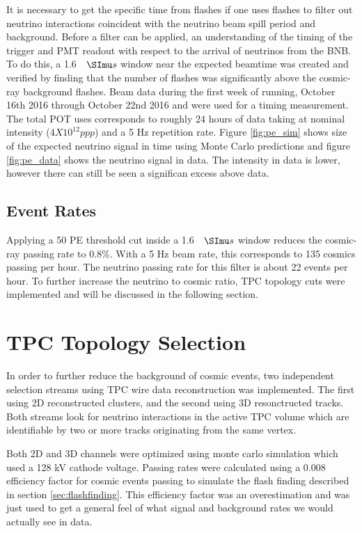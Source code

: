 It is necessary to get the specific time from flashes if one uses flashes to filter out neutrino interactions coincident with the neutrino beam spill period and background. Before a filter can be applied, an understanding of the timing of the trigger and PMT readout with respect to the arrival of neutrinos from the BNB. To do this, a 1.6 $\micro s$ window near the expected beamtime was created and verified by finding that the number of flashes was significantly above the cosmic-ray background flashes. Beam data during the first week of running, October 16th 2016 through October 22nd 2016 and were used for a timing measurement. The total POT uses corresponds to roughly 24 hours of data taking at nominal intensity ($4 X 10^{12} ppp$) and a 5 Hz repetition rate. Figure \ref{fig:pe_sim} shows size of the expected neutrino signal in time using Monte Carlo predictions and figure \ref{fig:pe_data} shows the neutrino signal in data. The intensity in data is lower, however there can still be seen a significan excess above data.

\subsection{Event Rates}
Applying a 50 PE threshold cut inside a 1.6 $\micro s$ window reduces the cosmic-ray passing rate to 0.8\%. With a 5 Hz beam rate, this corresponds to 135 cosmics passing per hour. The neutrino passing rate for this filter is about 22 events per hour. To further increase the neutrino to cosmic ratio, TPC topology cuts were implemented and will be discussed in the following section.
\section{TPC Topology Selection}  
In order to further reduce the background of cosmic events, two independent selection streams using TPC wire data reconstruction was implemented. The first using 2D reconstructed clusters, and the second using 3D resonctructed tracks. Both streams look for neutrino interactions in the active TPC volume which are identifiable by two or more tracks originating from the same vertex.

Both 2D and 3D channels were optimized using monte carlo simulation which used a 128 kV cathode voltage. Passing rates were calculated using a 0.008 efficiency factor for cosmic events passing to simulate the flash finding described in section \ref{sec:flashfinding}. This efficiency factor was an overestimation and was just used to get a general feel of what signal and background rates we would actually see in data. 
